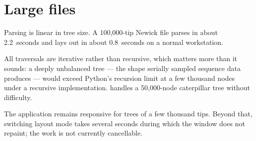 \section{Large files}

Parsing is linear in tree size. A 100{,}000-tip Newick file parses in about
2.2~seconds and lays out in about 0.8~seconds on a normal workstation.

All traversals are iterative rather than recursive, which matters more than it
sounds: a deeply unbalanced tree --- the shape serially sampled sequence data
produces --- would exceed Python's recursion limit at a few thousand nodes under
a recursive implementation. \app{} handles a 50{,}000-node caterpillar tree
without difficulty.

The application remains responsive for trees of a few thousand tips. Beyond that,
switching layout mode takes several seconds during which the window does not
repaint; the work is not currently cancellable.
